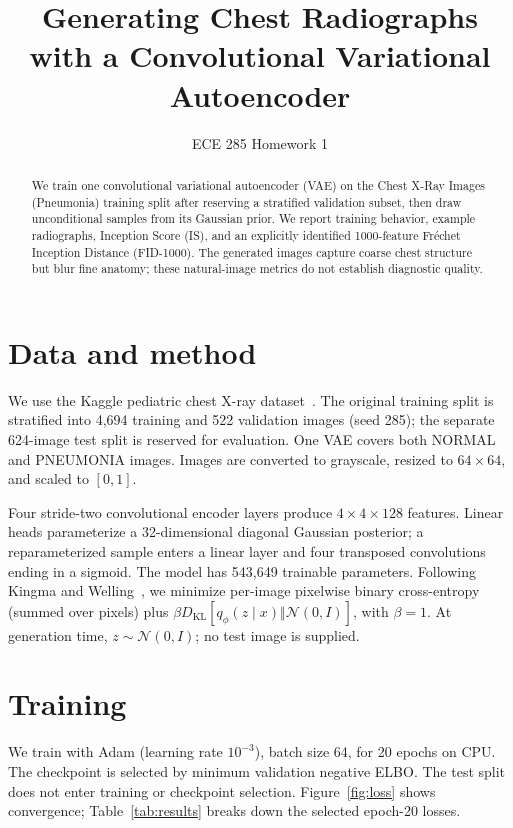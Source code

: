 \documentclass{article}
\title{Generating Chest Radiographs with a Convolutional Variational Autoencoder}
\author{ECE 285 Homework 1}
\begin{document}
\maketitle
\suppressfloats[t]

\begin{abstract}
We train one convolutional variational autoencoder (VAE) on the Chest X-Ray
Images (Pneumonia) training split after reserving a stratified validation
subset, then draw unconditional samples from its Gaussian prior. We report
training behavior, example radiographs, Inception
Score (IS), and an explicitly identified 1000-feature Fr\'echet Inception
Distance (FID-1000). The generated images capture coarse chest structure but
blur fine anatomy; these natural-image metrics do not establish diagnostic
quality.
\end{abstract}

\section{Data and method}
We use the Kaggle pediatric chest X-ray dataset~\cite{mooney}. The original
training split is stratified into 4,694 training and 522 validation images
(seed 285); the separate 624-image test split is reserved for evaluation.
One VAE covers both NORMAL and PNEUMONIA images. Images are converted to
grayscale, resized to $64\times64$, and scaled to $[0,1]$.

Four stride-two convolutional encoder layers produce $4\times4\times128$
features. Linear heads parameterize a 32-dimensional diagonal Gaussian
posterior; a reparameterized sample enters a linear layer and four transposed
convolutions ending in a sigmoid. The model has 543,649 trainable parameters.
Following Kingma and Welling~\cite{kingma}, we minimize per-image pixelwise
binary cross-entropy (summed over pixels) plus
$\beta D_{\mathrm{KL}}[q_\phi(z\mid x)\Vert\mathcal N(0,I)]$, with $\beta=1$.
At generation time, $z\sim\mathcal N(0,I)$; no test image is supplied.

\section{Training}
We train with Adam (learning rate $10^{-3}$), batch size 64, for 20 epochs on
CPU. The checkpoint is selected by minimum validation negative ELBO. The test
split does not enter training or checkpoint selection. Figure~\ref{fig:loss}
shows convergence; Table~\ref{tab:results} breaks down the selected epoch-20
losses.
\end{document}
